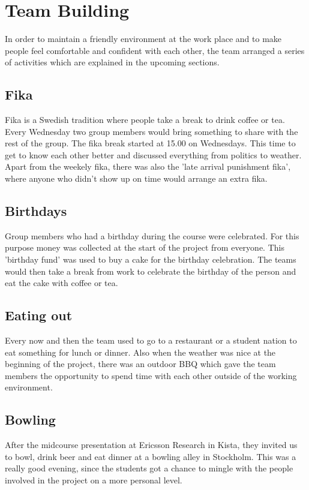 \section{Team Building}

In order to maintain a friendly environment at the work place and to make people
feel comfortable and confident with each other, the team arranged a series of activities which are explained in the upcoming sections.

\subsection{Fika}
Fika is a Swedish tradition where people take a break to drink coffee or tea. Every Wednesday two group members would bring something to share with the rest of the group. The fika break started at 15.00 
on Wednesdays. This time to get to know each other better and discussed 
everything from politics to weather. Apart from the weekely fika, there was also the 'late arrival punishment fika',
where anyone who didn't show up on time would arrange an extra fika.

\subsection{Birthdays}
Group members who had a birthday during the course were celebrated. For this purpose 
money was collected at the start of the project from everyone. This 'birthday fund' was used to buy a cake for the birthday celebration. 
The teams would then take a break from work to celebrate the birthday of the person and eat the cake with coffee or tea. 

\subsection{Eating out}
Every now and then the team used to go to a restaurant or a student nation to eat something for lunch or dinner. Also when the weather 
was nice at the beginning of the project, there was an outdoor BBQ which gave the team members the opportunity to spend time with each
other outside of the working environment.

\subsection{Bowling}
After the midcourse presentation at Ericsson Research in Kista, they invited us to bowl, drink beer and eat dinner at a bowling alley in Stockholm. This was a really good evening, since the students got a chance to mingle with the people involved in the project on a more personal level.
